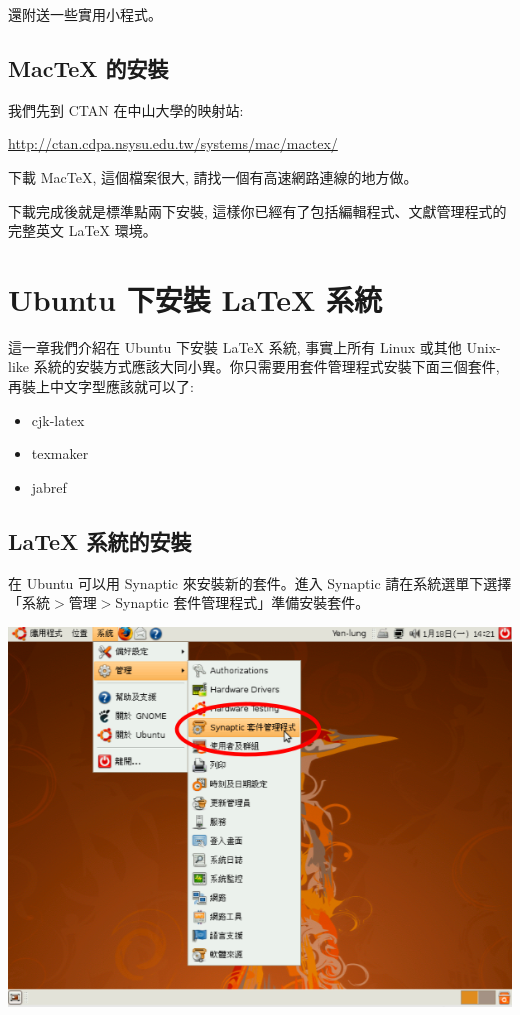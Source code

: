 \documentclass[12pt]{report}
\newcommand{\hei}[1]{{\CJKfamily{hei}#1}}   			%
\begin{document}
還附送一些實用小程式。

%
\section{MacTeX 的安裝}

我們先到 CTAN 在中山大學的映射站:

\url{http://ctan.cdpa.nsysu.edu.tw/systems/mac/mactex/}

下載 MacTeX, 這個檔案很大, 請找一個有高速網路連線的地方做。

下載完成後就是標準點兩下安裝, 這樣你已經有了包括編輯程式、文獻管理程式的完整英文 \LaTeX{} 環境。

\chapter{Ubuntu 下安裝 \LaTeX{} 系統}
這一章我們介紹在 Ubuntu 下安裝 \LaTeX{} 系統, 事實上所有 Linux 或其他 Unix-like 系統的安裝方式應該大同小異。你只需要用套件管理程式安裝下面三個套件, 再裝上中文字型應該就可以了:

\begin{itemize}
\item cjk-latex
\item texmaker
\item jabref
\end{itemize}

\section{\LaTeX{} 系統的安裝}
在 Ubuntu 可以用 Synaptic 來安裝新的套件。進入 Synaptic 請在系統選單下選擇「{\hei{系統$>$管理$>$Synaptic 套件管理程式}}」準備安裝套件。

\begin{center}
\includegraphics[scale=0.5]{ubuntu_synaptic.png}
\end{center}
\end{document}
